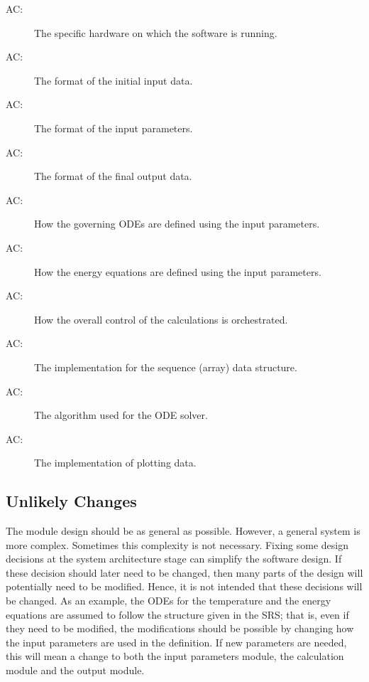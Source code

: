 \documentclass[12pt]{article}
\newcounter{acnum}
\newcommand{\actheacnum}{AC\theacnum}
\begin{document}
\begin{description}
\item[ \actheacnum \label{acHardware}:] The specific
  hardware on which the software is running.
\item[ \actheacnum \label{acInput}:] The format of the
  initial input data.
\item[ \actheacnum \label{acParams}:] The format of the
  input parameters.
\item[ \actheacnum \label{acOutput}:] The format of the
  final output data.
\item[ \actheacnum \label{acODEs}:] How the governing ODEs
  are defined using the input parameters.
\item[ \actheacnum \label{acEnergy}:] How the energy
  equations are defined using the input parameters.
\item[ \actheacnum \label{acControl}:] How the overall
  control of the calculations is orchestrated.
\item[ \actheacnum \label{acSeqDS}:] The implementation
  for the sequence (array) data structure.
\item[ \actheacnum \label{acSolver}:] The algorithm used
  for the ODE solver.
\item[ \actheacnum \label{acPlot}:] The implementation of
  plotting data.
\end{description}

\subsection{Unlikely Changes} \label{SecUchange}

The module design should be as general as possible. However, a general system is
more complex. Sometimes this complexity is not necessary. Fixing some design
decisions at the system architecture stage can simplify the software design. If
these decision should later need to be changed, then many parts of the design
will potentially need to be modified. Hence, it is not intended that these
decisions will be changed.  As an example, the ODEs for the temperature and the
energy equations are assumed to follow the structure given in the SRS; that is,
even if they need to be modified, the modifications should be possible by
changing how the input parameters are used in the definition.  If new parameters
are needed, this will mean a change to both the input parameters module, the
calculation module and the output module.
\end{document}
